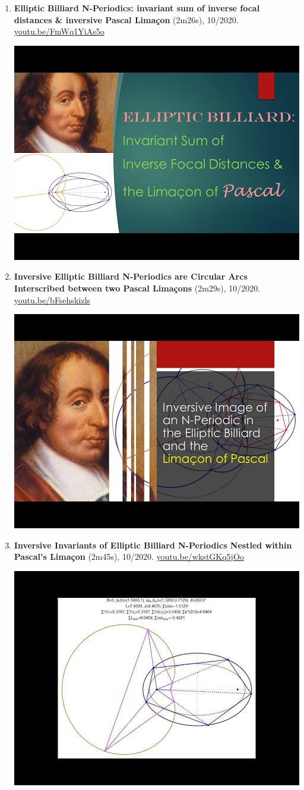 \documentclass[12pt]{article}
\begin{document}
\begin{enumerate}[resume]
\item \textbf{Elliptic Billiard N-Periodics: invariant sum of inverse focal distances \& inversive Pascal Limaçon} (2m26s), 10/2020. \href{https://youtu.be/FmWq1YiAs5o}{\url{youtu.be/FmWq1YiAs5o}}
\begin{center}\includegraphics[width=.5\textwidth]{pics/FmWq1YiAs5o.jpg}\end{center}
% 
\item \textbf{Inversive Elliptic Billiard N-Periodics are Circular Arcs Interscribed between two Pascal Limaçons} (2m29s), 10/2020. \href{https://youtu.be/bFsehskizls}{\url{youtu.be/bFsehskizls}}
\begin{center}\includegraphics[width=.5\textwidth]{pics/bFsehskizls.jpg}\end{center}
% 
\item \textbf{Inversive Invariants of Elliptic Billiard N-Periodics Nestled within Pascal's Limaçon} (2m45s), 10/2020. \href{https://youtu.be/wkstGKq5jOo}{\url{youtu.be/wkstGKq5jOo}}
\begin{center}\includegraphics[width=.5\textwidth]{pics/wkstGKq5jOo.jpg}\end{center}

\end{enumerate}
\end{document}
